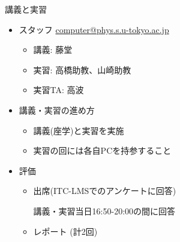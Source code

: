\begin{frame}[t,fragile]{講義と実習}
  \begin{itemize}
  \item スタッフ \href{mailto:computer@phys.s.u-tokyo.ac.jp}{computer@phys.s.u-tokyo.ac.jp}
    \begin{itemize}
    \item 講義: 藤堂
    \item 実習: 高橋助教、山崎助教
    \item 実習TA: 高波
    \end{itemize}
  \item 講義・実習の進め方
    \begin{itemize}
    \item 講義(座学)と実習を実施
    \item 実習の回には各自PCを持参すること
    \end{itemize}
  \item 評価
    \begin{itemize}
    \item 出席(ITC-LMSでのアンケートに回答)

      講義・実習当日16:50-20:00の間に回答
      
    \item レポート (計2回)
    \end{itemize}    
  \end{itemize}    
\end{frame}
